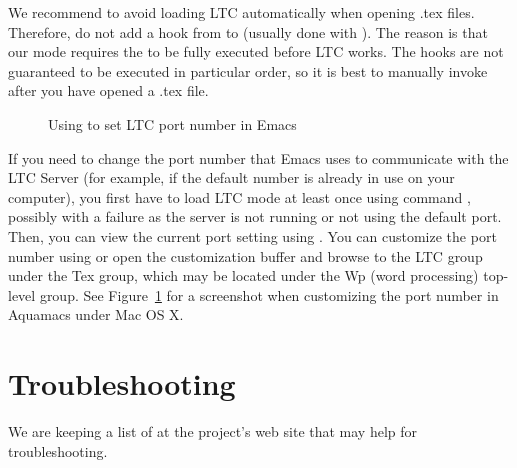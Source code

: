 We recommend to avoid loading LTC automatically when opening .tex files.  Therefore, do not add a hook from  to  (usually done with ).   The reason is that our mode requires the  to be fully executed before LTC works. The hooks are not guaranteed to be executed in particular order, so it is best to manually invoke  after you have opened a .tex file.

\begin{figure}[t]
\centering
{}
\caption[Setting LTC port number in Emacs]{Using  to set LTC port number in Emacs} \label{fig:emacs-port}
\end{figure}

If you need to change the port number that Emacs uses to communicate with the LTC Server (for example, if the default number is already in use on your computer), you first have to load LTC mode at least once using command , possibly with a failure as the server is not running or not using the default port.  Then, you can view the current port setting using .  You can customize the port number using  or open the customization buffer and browse to the LTC group under the Tex group, which may be located under the Wp (word processing) top-level group.  See Figure~\ref{fig:emacs-port} for a screenshot when customizing the port number in Aquamacs under Mac OS X.

%

\section{Troubleshooting}

We are keeping a list of  at the project's web site that may help for troubleshooting.
